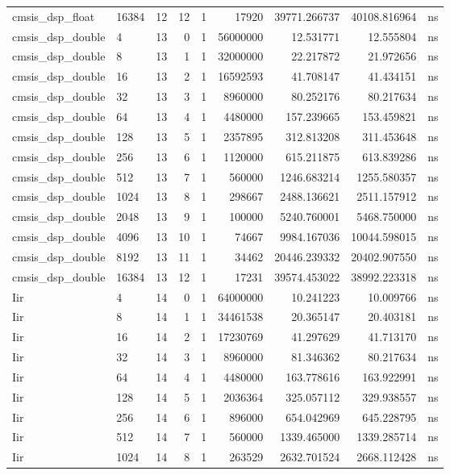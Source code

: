 \begin{tabular}{llrrrrrrl}
cmsis\_dsp\_float & 16384 & 12 & 12 & 1 & 17920 & 39771.266737 & 40108.816964 & ns \\
cmsis\_dsp\_double & 4 & 13 & 0 & 1 & 56000000 & 12.531771 & 12.555804 & ns \\
cmsis\_dsp\_double & 8 & 13 & 1 & 1 & 32000000 & 22.217872 & 21.972656 & ns \\
cmsis\_dsp\_double & 16 & 13 & 2 & 1 & 16592593 & 41.708147 & 41.434151 & ns \\
cmsis\_dsp\_double & 32 & 13 & 3 & 1 & 8960000 & 80.252176 & 80.217634 & ns \\
cmsis\_dsp\_double & 64 & 13 & 4 & 1 & 4480000 & 157.239665 & 153.459821 & ns \\
cmsis\_dsp\_double & 128 & 13 & 5 & 1 & 2357895 & 312.813208 & 311.453648 & ns \\
cmsis\_dsp\_double & 256 & 13 & 6 & 1 & 1120000 & 615.211875 & 613.839286 & ns \\
cmsis\_dsp\_double & 512 & 13 & 7 & 1 & 560000 & 1246.683214 & 1255.580357 & ns \\
cmsis\_dsp\_double & 1024 & 13 & 8 & 1 & 298667 & 2488.136621 & 2511.157912 & ns \\
cmsis\_dsp\_double & 2048 & 13 & 9 & 1 & 100000 & 5240.760001 & 5468.750000 & ns \\
cmsis\_dsp\_double & 4096 & 13 & 10 & 1 & 74667 & 9984.167036 & 10044.598015 & ns \\
cmsis\_dsp\_double & 8192 & 13 & 11 & 1 & 34462 & 20446.239332 & 20402.907550 & ns \\
cmsis\_dsp\_double & 16384 & 13 & 12 & 1 & 17231 & 39574.453022 & 38992.223318 & ns \\
Iir & 4 & 14 & 0 & 1 & 64000000 & 10.241223 & 10.009766 & ns \\
Iir & 8 & 14 & 1 & 1 & 34461538 & 20.365147 & 20.403181 & ns \\
Iir & 16 & 14 & 2 & 1 & 17230769 & 41.297629 & 41.713170 & ns \\
Iir & 32 & 14 & 3 & 1 & 8960000 & 81.346362 & 80.217634 & ns \\
Iir & 64 & 14 & 4 & 1 & 4480000 & 163.778616 & 163.922991 & ns \\
Iir & 128 & 14 & 5 & 1 & 2036364 & 325.057112 & 329.938557 & ns \\
Iir & 256 & 14 & 6 & 1 & 896000 & 654.042969 & 645.228795 & ns \\
Iir & 512 & 14 & 7 & 1 & 560000 & 1339.465000 & 1339.285714 & ns \\
Iir & 1024 & 14 & 8 & 1 & 263529 & 2632.701524 & 2668.112428 & ns \\

\end{tabular}
